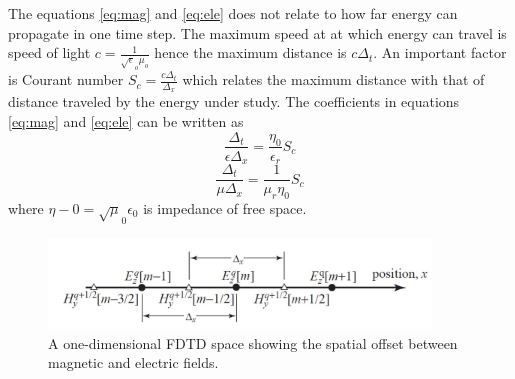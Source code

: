 The equations \eqref{eq:mag} and \eqref{eq:ele} does not relate to how far energy can propagate in one time step. The maximum speed at at which energy can travel is speed of light $c = \frac {1}{\sqrt\epsilon_o\mu_o}$ hence the maximum distance is $c\Delta_t$. An important factor is Courant number $S_c =  \frac {c\Delta_t}{\Delta_x}$ which relates the maximum distance with that of distance traveled by the energy under study. The coefficients in equations \eqref{eq:mag} and \eqref{eq:ele} can be written as 
\begin{equation}
	\frac {\Delta_t}{\epsilon\Delta_x} = \frac {\eta_0}{\epsilon_r}S_c
\end{equation}
\begin{equation}
	\frac {\Delta_t}{\mu\Delta_x} = \frac {1}{\mu_r\eta_0}S_c
\end{equation}
where $\eta-0 = \sqrt\mu_0\epsilon_0$ is impedance of free space.

\begin{figure}[htbp]
	\centering
		\includegraphics[width=4in]{Pictures/1dfdtd.jpg}
	\caption[1 dimensional FDTD Space]{A one-dimensional FDTD space showing the spatial offset between magnetic and electric fields.}
	\label{fig:1dfdtd}
\end{figure} 

